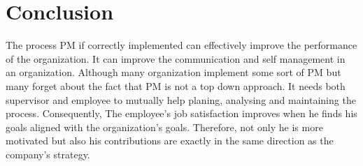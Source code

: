 \section{Conclusion}
The process \ac{PM} if correctly implemented can effectively improve the performance of the organization. It can improve the communication and self management in an organization. Although many organization implement some sort of \ac{PM} but many forget about the fact that \ac{PM} is not a top down approach. It needs both supervisor and employee to mutually help planing, analysing and maintaining the process. Consequently, The employee's job satisfaction improves when he finds his goals aligned with the organization's goals. Therefore, not only he is more motivated but also his contributions are exactly in the same direction as the company's strategy.
